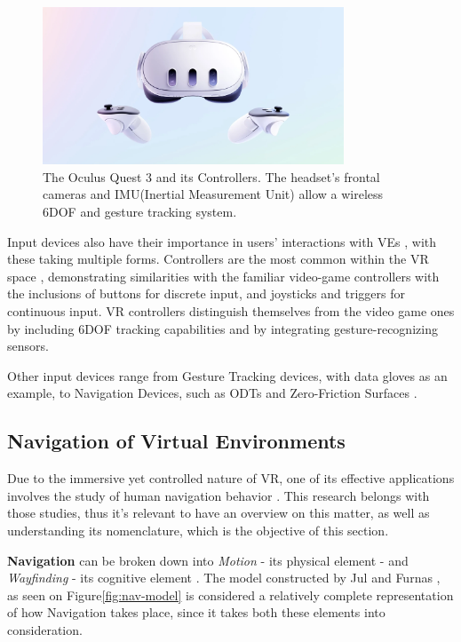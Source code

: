 \begin{figure}[b]
    \centering
    \includegraphics[width=0.8\textwidth]{NOVAthesisFiles/Images/papers/hmd-quest.png}
    \caption{The Oculus Quest 3 and its Controllers. The headset's frontal cameras and IMU(Inertial Measurement Unit) allow a wireless 
    \gls{6DOF} and gesture tracking system.}
    \label{fig:hmd-quest}
\end{figure}

Input devices also have their importance in users' interactions with \glspl{VE} \cite{Lee2020}, with these taking multiple forms.
Controllers are the most common within the \gls{VR} space \cite{Anthes2016,Boletsis2022}, demonstrating similarities with the familiar 
video-game controllers with the inclusions of buttons for discrete input, and joysticks and triggers for continuous input. \gls{VR} controllers 
distinguish themselves from the video game ones by including \gls{6DOF} tracking capabilities and by integrating gesture-recognizing sensors.

Other input devices range from Gesture Tracking devices, with data gloves as an example, to Navigation Devices, such as \glspl{ODT} 
and Zero-Friction Surfaces \cite{Anthes2016,Nilsson2018}.

\subsection{Navigation of Virtual Environments}
\label{sec:navigation-in-ves}

Due to the immersive yet controlled nature of \gls{VR}, one of its effective applications involves the study of human navigation behavior 
\cite{Feng2022}. This research belongs with those studies, thus it's relevant to have an overview on this matter, as well as understanding its 
nomenclature, which is the objective of this section.

\textbf{Navigation} can be broken down into \textit{Motion} - its physical element - and \textit{Wayfinding} - its cognitive element 
\cite{Eastgate2014}. The model constructed by Jul and Furnas \cite{Jul1997}, as seen on Figure\ref{fig:nav-model} is considered a relatively complete representation 
of how Navigation takes place, since it takes both these elements into consideration.

